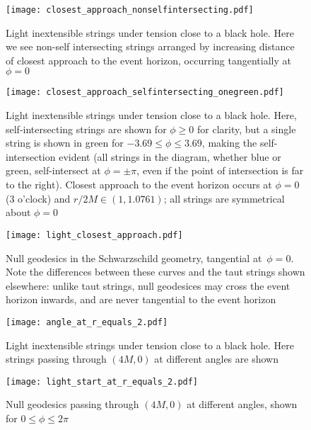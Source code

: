 \documentclass[review]{elsarticle}
\begin{document}
\begin{figure}[p] %
\centering
\texttt{[image: closest\_approach\_nonselfintersecting.pdf]}
\caption{Light inextensible strings under tension close to a black
  hole.  Here we see non-self intersecting strings arranged by
  increasing distance of closest approach to the event horizon,
  occurring tangentially at~$\phi=0$}
\label{closest_approach_non_self_intersecting}
\end{figure}

\begin{figure}[p] %
\centering
\texttt{[image: closest\_approach\_selfintersecting\_onegreen.pdf]}

\caption{Light inextensible strings under tension close to a black
  hole.  Here, self-intersecting strings are shown for $\phi\geqslant
  0$ for clarity, but a single string is shown in green for
  $-3.69\leqslant\phi\leqslant 3.69$, making the self-intersection
  evident (all strings in the diagram, whether blue or green,
  self-intersect at $\phi=\pm\pi$, even if the point of intersection
  is far to the right).  Closest approach to the event horizon occurs
  at $\phi=0$ (3 o'clock) and $r/2M\in\left(1,1.0761\right)$; all
  strings are symmetrical about $\phi=0$}
\label{closest_approach_self_intersecting}
\end{figure}

\begin{figure}[p] %
\centering
\texttt{[image: light\_closest\_approach.pdf]}
\caption{Null geodesics in the Schwarzschild geometry, tangential
  at~$\phi=0$.  Note the differences between these curves and the taut
  strings shown elsewhere: unlike taut strings, null geodesices may
  cross the event horizon inwards, and are never tangential to the
  event horizon}
\label{light_closest_approach}
\end{figure}

\begin{figure}[p]
\centering
\texttt{[image: angle\_at\_r\_equals\_2.pdf]} %
\caption{Light inextensible strings under tension close to a black
  hole.  Here strings passing through $(4M,0)$ at different angles are
  shown}
\label{strings_r_equals_2}
\end{figure}

\begin{figure}[p]
\centering
\texttt{[image: light\_start\_at\_r\_equals\_2.pdf]} %
\caption{Null geodesics passing through $(4M,0)$ at different angles,
  shown for $0\leqslant\phi\leqslant 2\pi$}
\label{light_r_equals_2}
\end{figure}
\end{document}
